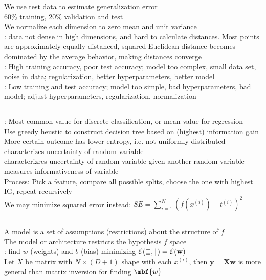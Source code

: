 \documentclass[10pt]{LatexTemplate/hw}
\begin{document}
\begin{multicols*}{5}
We use test data to estimate generalization error\\
60\% training, 20\% validation and test\\
We normalize each dimension to zero mean and unit variance\\
: data not dense in high dimensions, and hard to calculate distances. Most points are approximately equally distanced, squared Euclidean distance becomes dominated by the average behavior, making distances converge\\
: High training accuracy, poor test accuracy; model too complex, small data set, noise in data; regularization, better hyperparameters, better model\\
: Low training and test accuracy; model too simple, bad hyperparameters, bad model; adjust hyperparameters, regularization, normalization\\
\rule{\linewidth}{0.4pt}
: Most common value for discrete classification, or mean value for regression\\
Use greedy heustic to construct decision tree based on (highest) information gain\\
More certain outcome has lower entropy, i.e. not uniformly distributed\\
 characterizes uncertainty of random variable\\
 characterizres uncertainty of random variable given another random variable\\
 measures informativeness of variable\\
Process: Pick a feature, compare all possible splits, choose the one with highest IG, repeat recursively\\
We may minimize squared error instead: $SE=\sum_{i=1}^N(f(x^{(i)})-t^{(i)})^2$\\
\rule{\linewidth}{0.4pt}
A model is a set of assumptions (restrictions) about the structure of $f$\\
The model or architecture restricts the hypothesis $f$ space\\
: find $w$ (weights) and $b$ (bias) minimizing $\cal{E}(w,b)=\cal{E}(\mathbf{w})$\\
Let $X$ be matrix with $N\times(D+1)$ shape with each $x^{(i)}$, then $\mathbf{y=Xw}$
 is more general than matrix inversion for finding $\mbf{w}$\\

\end{multicols*}
\end{document}
